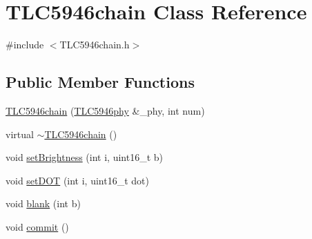 \hypertarget{class_t_l_c5946chain}{\section{T\-L\-C5946chain Class Reference}
\label{class_t_l_c5946chain}
}


{\ttfamily \#include $<$T\-L\-C5946chain.\-h$>$}

\subsection*{Public Member Functions}
\begin{DoxyCompactItemize}
\item 
\hyperlink{class_t_l_c5946chain_a626dc34cd82fb1cc490113d33d8ff597}{T\-L\-C5946chain} (\hyperlink{class_t_l_c5946phy}{T\-L\-C5946phy} \&\-\_\-phy, int num)
\item 
virtual \hyperlink{class_t_l_c5946chain_a0035f5d1ccd467eaf1ac37262cbf4c60}{$\sim$\-T\-L\-C5946chain} ()
\item 
void \hyperlink{class_t_l_c5946chain_af53b7ea5210b5a3862b824de82fb0167}{set\-Brightness} (int i, uint16\-\_\-t b)
\item 
void \hyperlink{class_t_l_c5946chain_a748083a734df2a9ea89d910e3c1a88b8}{set\-D\-O\-T} (int i, uint16\-\_\-t dot)
\item 
void \hyperlink{class_t_l_c5946chain_a97cb65c2331f1b6d82f3fdef2bcffa2f}{blank} (int b)
\item 
void \hyperlink{class_t_l_c5946chain_a87c446b0aee06efcd78dfd659a8b7502}{commit} ()
\end{DoxyCompactItemize}


